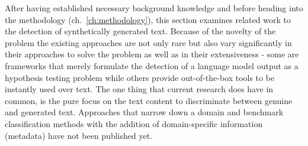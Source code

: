 After having established necessary background knowledge and before heading into the methodology (ch.~\ref{ch:methodology}), this section examines related work to the detection of synthetically generated text. Because of the novelty of the problem the existing approaches are not only rare but also vary significantly in their approaches to solve the problem as well as in their extensiveness - some are frameworks that merely formulate the detection of a language model output as a hypothesis testing problem while others provide out-of-the-box tools to be instantly used over text. The one thing that current research does have in common, is the pure focus on the text content to discriminate between genuine and generated text. Approaches that narrow down a domain and benchmark classification methods with the addition of domain-specific information (metadata) have not been published yet.






